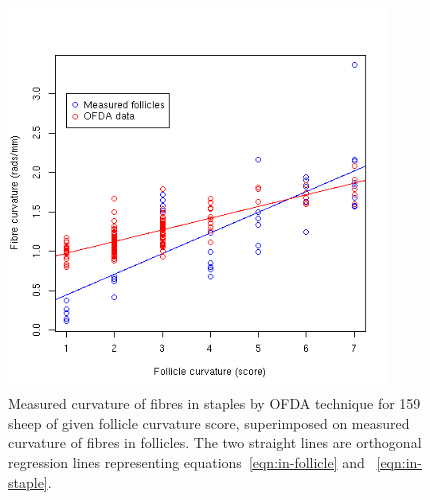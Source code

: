 %

\begin{figure}[!h]
  \centering
   \includegraphics[width=0.9\textwidth]{ovly.png}
  \caption{Measured curvature of fibres in staples by OFDA technique for 159 sheep of   given follicle curvature score, superimposed on measured curvature of fibres in follicles. The two straight lines are orthogonal regression lines representing equations~\ref{eqn:in-follicle} and ~\ref{eqn:in-staple}.}
  \label{fig:ovly}
\end{figure}

%

